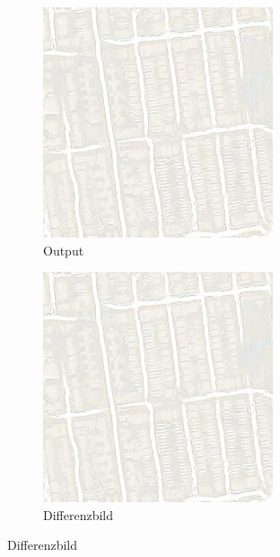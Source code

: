 \begin{figure}[ht]
\begin{subfigure}[t]{.14\textwidth}
  \end{subfigure}
  \begin{subfigure}[t]{.14\textwidth}
    \centering
    \caption*{Output}
    \includegraphics[width=\linewidth]{images/cycleGanResults/Maps19Ld120_E100_Lr0002.jpg}
  \end{subfigure}
  \begin{subfigure}[t]{.14\textwidth}
    \centering
    \caption*{Differenzbild}
    \includegraphics[width=\linewidth]{images/cycleGanResults/Maps19Ld120_E100_Lr0002.jpg}
  \end{subfigure}


\end{figure}

